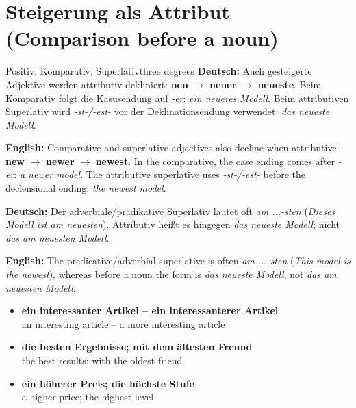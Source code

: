 \documentclass[a4paper,11pt]{article}
\newcommand{\GermanText}[1]{\textbf{Deutsch: }#1\par}
\newcommand{\EnglishText}[1]{{\small\color{SoftGray}\textbf{English: }#1\par}}
\newcommand{\ExampleItem}[2]{\item \textbf{#1}\\{\small\color{SoftGray}#2}}
\begin{document}
\section{Steigerung als Attribut \textnormal{(Comparison before a noun)}}
\begin{grammarentry}{Positiv, Komparativ, Superlativ}{three degrees}
\GermanText{Auch gesteigerte Adjektive werden attributiv dekliniert: \textbf{neu} $\rightarrow$ \textbf{neuer} $\rightarrow$ \textbf{neueste}. Beim Komparativ folgt die Kasusendung auf \emph{-er}: \emph{ein neueres Modell}. Beim attributiven Superlativ wird \emph{-st-/-est-} vor der Deklinationsendung verwendet: \emph{das neueste Modell}.}
\EnglishText{Comparative and superlative adjectives also decline when attributive: \textbf{new} $\rightarrow$ \textbf{newer} $\rightarrow$ \textbf{newest}. In the comparative, the case ending comes after \emph{-er}: \emph{a newer model}. The attributive superlative uses \emph{-st-/-est-} before the declensional ending: \emph{the newest model}.}
\GermanText{Der adverbiale/prädikative Superlativ lautet oft \emph{am ...-sten} (\emph{Dieses Modell ist am neuesten}). Attributiv heißt es hingegen \emph{das neueste Modell}; nicht \emph{das am neuesten Modell}.}
\EnglishText{The predicative/adverbial superlative is often \emph{am ...-sten} (\emph{This model is the newest}), whereas before a noun the form is \emph{das neueste Modell}, not \emph{das am neuesten Modell}.}
\end{grammarentry}
\begin{exbox}\begin{itemize}
\ExampleItem{ein interessanter Artikel -- ein interessanterer Artikel}{an interesting article -- a more interesting article}
\ExampleItem{die besten Ergebnisse; mit dem ältesten Freund}{the best results; with the oldest friend}
\ExampleItem{ein höherer Preis; die höchste Stufe}{a higher price; the highest level}
\end{itemize}\end{exbox}
\end{document}
